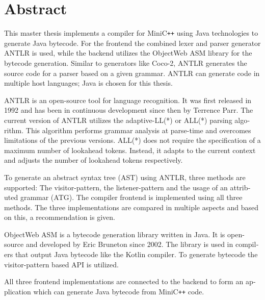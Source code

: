 \chapter{Abstract}


\begin{english} %

This master thesis implements a compiler for MiniC\verb|++| using Java technologies to generate Java bytecode. For the frontend the combined lexer and parser generator ANTLR is used, while the backend utilizes the ObjectWeb ASM library for the bytecode generation. Similar to generators like Coco-2, ANTLR generates the source code for a parser based on a given grammar. ANTLR can generate code in multiple host languages; Java is chosen for this thesis. 

ANTLR is an open-source tool for language recognition. It was first released in 1992 and has been in continuous development since then by Terrence Parr. The current version of ANTLR utilizes the adaptive-LL(*) or ALL(*) parsing algorithm. This algorithm performs grammar analysis at parse-time and overcomes limitations of the previous versions. ALL(*) does not require the specification of a maximum number of lookahead tokens. Instead, it adapts to the current context and adjusts the number of lookahead tokens respectively.

To generate an abstract syntax tree (AST) using ANTLR, three methods are supported: The visitor-pattern, the listener-pattern  and the usage of an attributed grammar (ATG). The compiler frontend is implemented using all three methods. The three implementations are compared in multiple aspects and based on this, a recommendation is given.

ObjectWeb ASM is a bytecode generation library written in Java. It is open-source and developed by Eric Bruneton since 2002. The library is used in compilers that output Java bytecode like the Kotlin compiler. To generate bytecode the visitor-pattern based API is utilized. 

All three frontend implementations are connected to the backend to form an application which can generate Java bytecode from MiniC\verb|++| code. 

\end{english}
